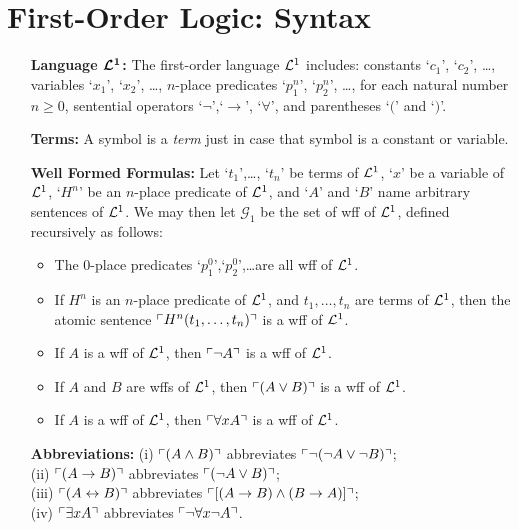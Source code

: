 \documentclass[a4paper, 11pt]{article} %
\begin{document}
\section*{\sc First-Order Logic: Syntax}

\begin{enumerate}[leftmargin=1.2in] %
	\item[\bf Language $\boldsymbol{\mathcal{L}^1}$:] The first-order language $\mathcal{L}^1$ includes: constants `$c_1$', `$c_2$', \dots, variables `$x_1$', `$x_2$', \dots, $n$-place predicates `$p_1^n$', `$p_2^n$', \dots, for each natural number $n\geq0$, sentential operators `$\neg$',`$\rightarrow$', `$\forall$', and parentheses `$($' and `$)$'.
	\item[\bf Terms:] A symbol is a \textit{term} just in case that symbol is a constant or variable.
	\item[\bf Well Formed Formulas:] Let `$t_1$',\dots, `$t_n$' be terms of $\mathcal{L}^1$, `$x$' be a variable of $\mathcal{L}^1$, `$H^n$' be an $n$-place predicate of $\mathcal{L}^1$, and `$A$' and `$B$' name arbitrary sentences of $\mathcal{L}^1$. We may then let $\mathcal{G}_1$ be the set of wff of $\mathcal{L}^1$, defined recursively as follows:
	      \begin{itemize}
		      \item The 0-place predicates `$p_1^0$',`$p_2^0$',\dots are all wff of $\mathcal{L}^1$.
		      \item If ${H^n}$ is an $n$-place predicate of $\mathcal{L}^1$, and ${t_1},\dots,{t_n}$ are terms of $\mathcal{L}^1$, then the atomic sentence $\ulcorner H^n(t_1,\dots,t_n)\urcorner$ is a wff of $\mathcal{L}^1$.
		      \item If ${A}$ is a wff of $\mathcal{L}^1$, then $\ulcorner\neg A\urcorner$ is a wff of $\mathcal{L}^1$.
		      \item If ${A}$ and ${B}$ are wffs of $\mathcal{L}^1$, then $\ulcorner(A\vee B)\urcorner$ is a wff of $\mathcal{L}^1$.
		      \item If ${A}$ is a wff of $\mathcal{L}^1$, then $\ulcorner\forall xA\urcorner$ is a wff of $\mathcal{L}^1$.
	      \end{itemize}
	\item[\bf Abbreviations:] (i) $\ulcorner(A\wedge B)\urcorner$ abbreviates $\ulcorner\neg(\neg A\vee\neg B)\urcorner$;\\ (ii) $\ulcorner(A\rightarrow B)\urcorner$ abbreviates $\ulcorner(\neg A\vee B)\urcorner$;\\ (iii) $\ulcorner(A\leftrightarrow B)\urcorner$ abbreviates $\ulcorner[(A\rightarrow B)\wedge(B\rightarrow A)]\urcorner$;\\ (iv) $\ulcorner\exists xA\urcorner$ abbreviates $\ulcorner\neg\forall x\neg A\urcorner$.
\end{enumerate}
\end{document}
